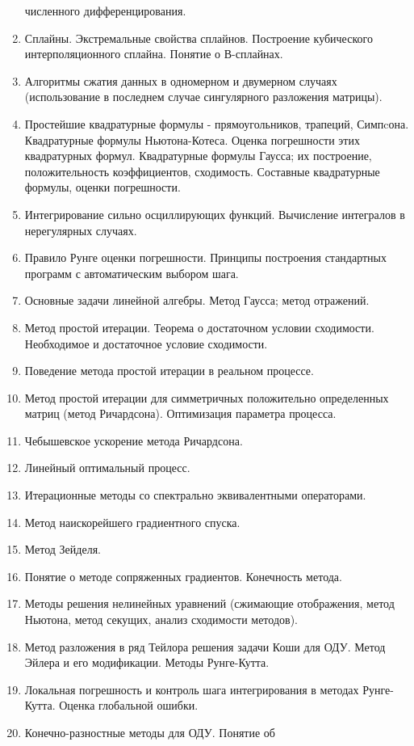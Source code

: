 \documentclass[a4paper]{article}
\begin{document}
\begin{enumerate}
  численного дифференцирования.
\item Сплайны. Экстремальные свойства сплайнов. Построение кубического
  интерполяционного сплайна. Понятие о В-сплайнах.
\item Алгоритмы сжатия данных в одномерном и двумерном случаях
  (использование в последнем случае сингулярного разложения матрицы).
\item Простейшие квадратурные формулы - прямоугольников, трапеций,
  Симпcона. Квадратурные формулы Ньютона-Котеса. Оценка погрешности
  этих квадратурных формул. Квадратурные формулы Гаусса; их
  построение, положительность коэффициентов, сходимость. Составные
  квадратурные формулы, оценки погрешности.
\item Интегрирование сильно осциллирующих функций. Вычисление
  интегралов в нерегулярных случаях.
\item Правило Рунге оценки погрешности. Принципы построения
  стандартных программ с автоматическим выбором шага.
\item Основные задачи линейной алгебры. Метод Гаусса; метод отражений.
\item Метод простой итерации. Теорема о достаточном условии
  сходимости. Необходимое и достаточное условие сходимости.
\item Поведение метода простой итерации в реальном процессе.
\item Метод простой итерации для симметричных положительно
  определенных матриц (метод Ричардсона). Оптимизация параметра
  процесса.
\item {\sf Чебышевское ускорение метода Ричардсона.}
\item Линейный оптимальный процесс.
\item Итерационные методы со спектрально эквивалентными операторами.
\item Метод наискорейшего градиентного спуска.
\item Метод Зейделя.
\item Понятие о методе сопряженных градиентов. Конечность метода.
\item Методы решения нелинейных уравнений (сжимающие отображения,
  метод Ньютона, метод секущих, анализ сходимости методов).
\item Метод разложения в ряд Тейлора решения задачи Коши для
  ОДУ. Метод Эйлера и его модификации. Методы Рунге-Кутта.
\item Локальная погрешность и контроль шага интегрирования в методах
  Рунге-Кутта.  Оценка глобальной ошибки.
\item Конечно-разностные методы для ОДУ. Понятие об

\end{enumerate}
\end{document}
